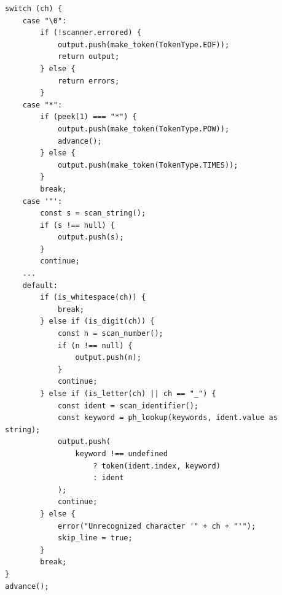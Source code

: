 %
%
%
%
\begin{lstlisting}
switch (ch) {
    case "\0":
        if (!scanner.errored) {
            output.push(make_token(TokenType.EOF));
            return output;
        } else {
            return errors;
        }
    case "*":
        if (peek(1) === "*") {
            output.push(make_token(TokenType.POW));
            advance();
        } else {
            output.push(make_token(TokenType.TIMES));
        }
        break;
    case '"':
        const s = scan_string();
        if (s !== null) {
            output.push(s);
        }
        continue;
    ...
    default:
        if (is_whitespace(ch)) { 
            break;
        } else if (is_digit(ch)) {
            const n = scan_number();
            if (n !== null) {
                output.push(n);
            }
            continue;
        } else if (is_letter(ch) || ch == "_") {
            const ident = scan_identifier();
            const keyword = ph_lookup(keywords, ident.value as string);
            output.push(
                keyword !== undefined 
                    ? token(ident.index, keyword) 
                    : ident
            );
            continue;
        } else {
            error("Unrecognized character '" + ch + "'");
            skip_line = true;
        }
        break;
}
advance();
\end{lstlisting}
